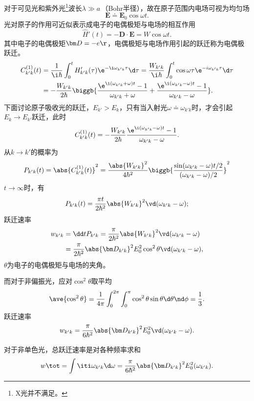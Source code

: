 对于可见光和紫外光\footnote{X光并不满足。}波长$\lambda\gg a$\,（Bohr半径），故在原子范围内电场可视为均匀场
\[
	\bm E\doteq\bm E_0\cos\omega t.
\]
光对原子的作用可近似表示成电子的电偶极矩与电场的相互作用
\[
	\hat H'(t)=-\bm D\cdot\bm E=W\cos\omega t.
\]
其中电子的电偶极矩$\bm D=-e\r$，电偶极矩与电场作用引起的跃迁称为电偶极跃迁。
\begin{align*}
	C_{k'k}^{(1)}(t)&=\frac1{\i\hbar}\int_0^tH_{k'k}'(\tau)\e^{-\i\omega_{k'k}\tau}\d\tau=\frac{W_{k'k}}{\i\hbar}\int_0^t\cos\omega\tau\e^{-i\omega_{k'k}\tau}\d\tau\\
	&=-\frac{W_{k'k}}{2\hbar}\biggb{\frac{\e^{\i(\omega_{k'k}+\omega)t}-1}{\omega_{k'k}+\omega}+\frac{\e^{\i(\omega_{k'k}-\omega)t}-1}{\omega_{k'k}-\omega}}.
\end{align*}
下面讨论原子吸收光的跃迁，$E_{k'}>E_k$，只有当入射光$\omega\doteq\omega_{k'k}$时，才会引起$E_k\to E_{k'}$跃迁，此时
\begin{align*}
	C_{k'k}^{(1)}(t)=-\frac{W_{k'k}}{2\hbar}\frac{\e^{\i(\omega_{k'k}-\omega)t}-1}{\omega_{k'k}-\omega}.
\end{align*}
从$k\to k'$的概率为
\begin{align}
	P_{k'k}(t)=\abs{C_{k'k}^{(1)}(t)}^2=\frac{\abs{W_{k'k}}^2}{4\hbar^2}\biggb{\frac{\sin(\omega_{k'k}-\omega)t/2}{(\omega_{k'k}-\omega)/2}}^2
\end{align}
$t\to\infty$时，有 
\begin{align}
	P_{k'k}(t)=\frac{\pi t}{2\hbar^2}\abs{W_{k'k}}^2\vd(\omega_{k'k}-\omega);
\end{align}
跃迁速率
\begin{align}
	w_{k'k}&=\dd tP_{k'k}=\frac\pi{2\hbar^2}\abs{W_{k'k}}^2\vd(\omega_{k'k}-\omega)\\
	&=\frac\pi{2\hbar^2}\abs{\bm D_{k'k}}^2E_0^2\cos^2\theta\vd(\omega_{k'k}-\omega),
\end{align}
$\theta$为电子的电偶极矩与电场的夹角。

而对于非偏振光，应对$\cos^2\theta$取平均
\[
	\ave{\cos^2\theta}=\frac1{4\pi}\int_0^{2\pi}\int_0^\pi\cos^2\theta\sin\theta\d\theta\nd\phi=\frac13.
\]
跃迁速率 
\begin{align}
	w_{k'k}=\frac\pi{6\hbar^2}\abs{\bm D_{k'k}}^2E_0^2\vd(\omega_{k'k}-\omega).
\end{align}

对于非单色光，总跃迁速率是对各种频率求和
\begin{align}
	w\tot=\int\iti\omega_{k'k}\d\omega=\frac\pi{6\hbar^2}\abs{\bm D_{k'k}}^2E_0^2(\omega_{k'k}).
\end{align}

